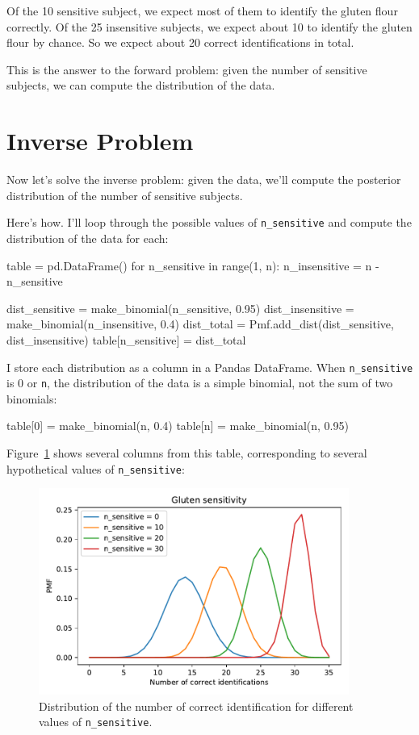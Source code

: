 \documentclass[12pt]{book}
\theoremstyle{exercise}
\newcommand{\py}[1]{{\tt #1}}%
\begin{document}
Of the 10 sensitive subject, we expect most of them to identify the gluten flour correctly.
Of the 25 insensitive subjects, we expect about 10 to identify the gluten flour by chance.
So we expect about 20 correct identifications in total.

This is the answer to the forward problem: given the number of sensitive subjects, we can compute the distribution of the data.

\section{Inverse Problem}

Now let's solve the inverse problem: given the data, we'll compute the posterior distribution of the number of sensitive subjects.

Here's how.  I'll loop through the possible values of \py{n_sensitive} and compute the distribution of the data for each:

\begin{code}
table = pd.DataFrame()
for n_sensitive in range(1, n):
    n_insensitive = n - n_sensitive

    dist_sensitive = make_binomial(n_sensitive, 0.95)
    dist_insensitive = make_binomial(n_insensitive, 0.4)
    dist_total = Pmf.add_dist(dist_sensitive, dist_insensitive)
    table[n_sensitive] = dist_total
\end{code}

I store each distribution as a column in a Pandas DataFrame.
When \py{n_sensitive} is 0 or \py{n}, the distribution of the data is a simple binomial, not the sum of two binomials:

\begin{code}
table[0] = make_binomial(n, 0.4)
table[n] = make_binomial(n, 0.95)
\end{code}

Figure~\ref{fig05-03} shows several columns from this table, corresponding to several hypothetical values of \py{n_sensitive}:

\begin{figure}
\centerline{\includegraphics[width=4in]{figs/fig05-03.pdf}}
\caption{Distribution of the number of correct identification for different values of \py{n_sensitive}.}
\label{fig05-03}
\end{figure}
\end{document}
